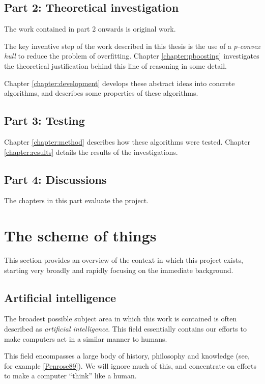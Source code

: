 \subsection*{Part 2: Theoretical investigation}

The work contained in part 2 onwards is original work.

The key inventive step of the work described in this thesis is the use of a
\emph{$p$-convex hull} to reduce the problem of overfitting.  Chapter
\ref{chapter:pboosting} investigates the theoretical justification
behind this line of reasoning in some detail.

Chapter \ref{chapter:development} develops these abstract ideas into
concrete algorithms, and describes some properties of these
algorithms.

\subsection*{Part 3: Testing}

Chapter \ref{chapter:method} describes how these algorithms were
tested.  Chapter \ref{chapter:results} details the results of the
investigations.

\subsection*{Part 4: Discussions}

The chapters in this part evaluate the project.

\section{The scheme of things}

This section provides an overview of the context in which this project
exists, starting very broadly and rapidly focusing on the immediate
background.

\subsection{Artificial intelligence}

The broadest possible subject area in which this work is contained is
often described as \emph{artificial intelligence}.  This field
essentially contains our efforts to make computers act in a similar
manner to humans.

This field encompasses a large body of history, philosophy and
knowledge (see, for example \ref{Penrose89}).  We will ignore much
of this, and concentrate on efforts to make a computer ``think'' like
a human.

